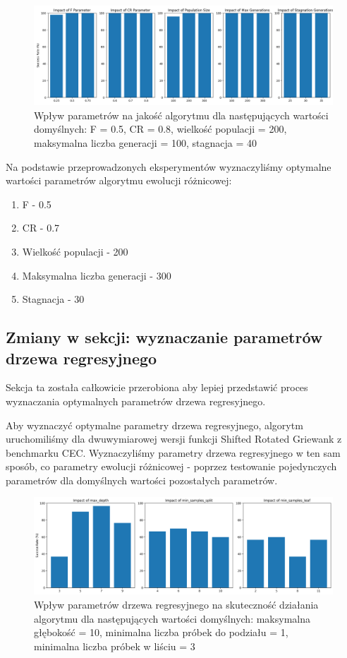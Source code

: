 \documentclass{article}
\begin{document}
\begin{figure}[H]
    \centering
    \includegraphics[width=\textwidth]{parameter_tuning_results_separate4.png}
    \caption{Wpływ parametrów na jakość algorytmu dla następujących wartości domyślnych: F = 0.5, CR = 0.8, wielkość populacji = 200, maksymalna liczba generacji = 100, stagnacja = 40}
    \label{fig:parameter_results4}
\end{figure}

Na podstawie przeprowadzonych eksperymentów wyznaczyliśmy optymalne wartości parametrów algorytmu ewolucji różnicowej:
\begin{enumerate}
    \item F - 0.5
    \item CR - 0.7
    \item Wielkość populacji - 200
    \item Maksymalna liczba generacji - 300
    \item Stagnacja - 30
\end{enumerate}

\subsection{Zmiany w sekcji: wyznaczanie parametrów drzewa regresyjnego}

Sekcja ta została całkowicie przerobiona aby lepiej przedstawić proces wyznaczania optymalnych parametrów drzewa regresyjnego.

Aby wyznaczyć optymalne parametry drzewa regresyjnego, algorytm uruchomiliśmy dla dwuwymiarowej wersji funkcji Shifted Rotated Griewank z benchmarku CEC. Wyznaczyliśmy parametry drzewa regresyjnego w ten sam sposób, co parametry ewolucji różnicowej - poprzez testowanie pojedynczych parametrów dla domyślnych wartości pozostałych parametrów.

\begin{figure}[H]
    \centering
    \includegraphics[width=\textwidth]{tree_parameter_tuning_separate_results2.png}
    \caption{Wpływ parametrów drzewa regresyjnego na skuteczność działania algorytmu dla następujących wartości domyślnych: maksymalna głębokość = 10, minimalna liczba próbek do podziału = 1, minimalna liczba próbek w liściu = 3}
    \label{fig:tree_parameter_results1}
\end{figure}
\end{document}
